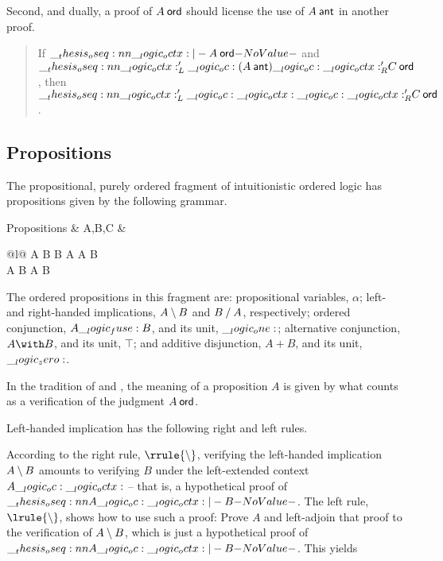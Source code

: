 Second, and dually, a proof of $A \ord$ should license the use of $A \ant$ in another proof.
\begin{quotation}
  If $\oseq{\octx |- A \ord}$ and $\oseq{\octx'_L \oc (A \ant) \oc \octx'_R |- C \ord}$, then $\oseq{\octx'_L \oc \octx \oc \octx'_R |- C \ord}$.
\end{quotation}



\subsection{Propositions}

The propositional, purely ordered fragment of intuitionistic ordered logic has propositions given by the following grammar.
\begin{syntax*}
  Propositions &
    A,B,C & \begin{array}[t]{@{}l@{}}
              \alpha \mid A \limp B \mid B \pmir A
                \mid A \fuse B \mid \one \\
              \mathllap{\mid {}} A \with B \mid \top
                \mid A \plus B \mid \zero
            \end{array}
\end{syntax*}
The ordered propositions in this fragment are:
propositional variables, $\alpha$;
left- and right-handed implications, $A \mathbin { \setminus } B$ and $B \mathbin { / } A$, respectively;
ordered conjunction, $A \__logic_fuse: B$, and its unit, $\__logic_one:$;
alternative conjunction, $A \with B$, and its unit, $\top$;
and
additive disjunction, $A \plus B$, and its unit, $\__logic_zero:$.

In the tradition of \citeauthor{Gentzen:MZ35} and \citeauthor{Martin-Lof:NJPL96}\autocites{Gentzen:MZ35}{Martin-Lof:NJPL96}, the meaning of a proposition $A$ is given by what counts as a verification of the judgment $A \ord$.

Left-handed implication has the following right and left rules.
According to the right rule, $\rrule{\limp}$, verifying the left-handed implication $A \mathbin { \setminus } B$ amounts to verifying $B$ under the left-extended context $A \__logic_oc: \__logic_octx:$ -- that is, a hypothetical proof of $\oseq{A \oc \octx |- B}$.
The left rule, $\lrule{\limp}$, shows how to use such a proof:
Prove $A$ and left-adjoin that proof to the verification of $A \mathbin { \setminus } B$, which is just a hypothetical proof of $\oseq{A \oc \octx |- B}$.
This yields 

